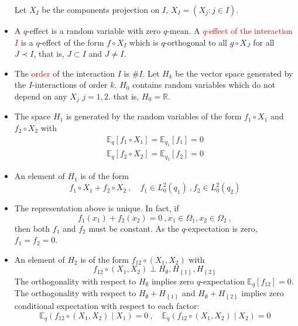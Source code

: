 \documentclass[xcolor=svgnames]{beamer}
\newcommand{\condexpat}[3]{\mathbb E_{#1}\left(#2 \middle| #3\right)}
\newcommand{\expectat}[2]{\mathbb E_{#1}\left[#2\right]}
\newcommand{\reals}{\mathbb{R}}
\newcommand{\rosso}[1]{\textcolor{red}{#1}}
\newcommand{\set}[1]{\left\{#1\right\}}
\renewcommand{\emph}{\rosso}
\begin{document}
\begin{frame}
\begin{itemize}
   Let $X_I$ be the components projection on $I$, $X_I = (X_j \colon j \in I)$.
    \item A $q$-effect is a random variable with zero $q$-mean. A \emph{$q$-effect of the interaction $I$} is a $q$-effect of the form $f\circ X_I$ which is $q$-orthogonal to all $g \circ X_J$ for all $J \prec I$, that is, $J \subset I$ and $J \neq I$.
    \item The \emph{order} of the interaction $I$ is $\# I$. Let $H_k$ be the vector space generated by the $I$-interactions of order $k$. $H_0$ contains random variables which do not depend on any $X_j$ $j=1,2$. that is, $H_0 = \reals$.
    \item The space $H_1$ is generated by the random variables of the form 
        $f_1\circ X_1$ and $f_2\circ X_2$
    with 
    \begin{gather*}
        \expectat q {f_1\circ X_1} = \expectat {q_1} {f_1} = 0 \\
           \expectat q {f_2\circ X_2} = \expectat {q_2} {f_2} = 0 
    \end{gather*}
   \item An element of $H_1$ is of the form
   \begin{equation*}
       f_1\circ X_1 + f_2 \circ X_2 \ , \quad f_1 \in L^2_0(q_1) \ , f_2 \in L^2_0(q_2)
   \end{equation*}
   \item The representation above is unique. In fact, if
   \begin{equation*}
       f_1(x_1) + f_2(x_2) = 0 \ , x_1 \in \Omega_1, x_2 \in \Omega_2 \ ,
   \end{equation*}
   then both $f_1$ and $f_2$ must be constant. As the $q$-expectation is zero, $f_1 = f_2 = 0$.
   \item An element of $H_2$ is of the form $f_{12} \circ(X_1,X_2)$ with
   \begin{equation*}
     f_{12} \circ(X_1,X_2) \perp H_{\emptyset}, H_{\set{1}}, H_{\set{2}}  
   \end{equation*}
   The orthogonality with respect to $H_{\emptyset}$ implies zero $q$-expectation $\expectat q {f_{12}} = 0$. The orthogonality with respect to $H_{\emptyset} + H_{\set{1}}$ and $H_{\emptyset} + H_{\set{2}}$ implies zero conditional expectation with respect to each factor:
   \begin{equation*}
       \condexpat {q} {f_{12} \circ (X_1,X_2)}{X_1} = 0 \ , \quad \condexpat {q} {f_{12} \circ (X_1,X_2)}{X_2} = 0
   \end{equation*}

\end{itemize}
\end{frame}
\end{document}
